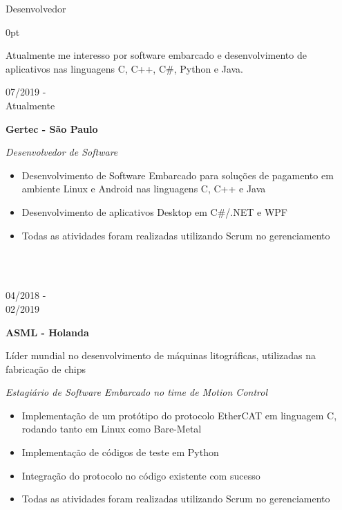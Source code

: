 \documentclass[a4paper]{article}
\begin{document}
\LARGE Desenvolvedor
\vspace{12.5pt}
\begin{adjustwidth}{\parindent}{0pt}
\begin{minipage}[t]{0.65\textwidth}
\large Atualmente me interesso por software embarcado e desenvolvimento de aplicativos nas linguagens C, C++, C\#, Python e Java.\\

\begin{minipage}[t]{0.2\textwidth}
\large{07/2019 - \\ Atualmente}
\end{minipage}
\begin{minipage}[t]{0.8\textwidth}
{
  \setlength{\parskip}{5.5pt}
  \Large{\textbf{Gertec - São Paulo}}

  \large{\textit{Desenvolvedor de Software}}
  \begin{itemize}
    \item \normalsize{Desenvolvimento de Software Embarcado para soluções de pagamento em ambiente Linux e Android nas linguagens C, C++ e Java}
    \item \normalsize{Desenvolvimento de aplicativos Desktop em C\#/.NET e WPF}
    \item \normalsize{Todas as atividades foram realizadas utilizando Scrum no gerenciamento}
  \end{itemize}
}
\end{minipage} \\ \\

\begin{minipage}[t]{0.2\textwidth}
\large{04/2018 - \\ 02/2019}
\end{minipage}
\begin{minipage}[t]{0.8\textwidth}
{
  \setlength{\parskip}{5.5pt}
  \Large{\textbf{ASML - Holanda}}
  
  \large{Líder mundial no desenvolvimento de máquinas litográficas, utilizadas na fabricação de chips}
  
  \large{\textit{Estagiário de Software Embarcado no time de Motion Control}}
  \begin{itemize}
    \item \normalsize{Implementação de um protótipo do protocolo EtherCAT em linguagem C, rodando tanto em Linux como Bare-Metal}
    \item \normalsize{Implementação de códigos de teste em Python}
    \item \normalsize{Integração do protocolo no código existente com sucesso}
    \item \normalsize{Todas as atividades foram realizadas utilizando Scrum no gerenciamento}
  \end{itemize}
}
\end{minipage} \\ \\


\end{minipage}
\end{adjustwidth}
\end{document}
